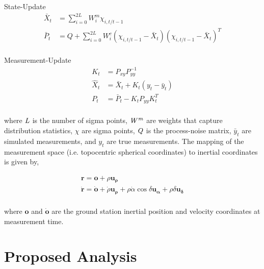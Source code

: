 \documentclass[a4paper]{article}
\renewcommand\vec{\mathbf}	%
\begin{document}
State-Update
\begin{equation}
\begin{aligned}
\bar{X}_t &= \sum_{i=0}^{2L} W^{m}_i \chi_{i,t/t-1} \\
\bar{P}_t &= Q + \sum_{i=0}^{2L} W^{c}_i (\chi_{i,t/t-1} - \bar{X}_t)(\chi_{i,t/t-1} - \bar{X}_t)^T  \\
\end{aligned}
\end{equation}

Measurement-Update
\begin{equation}
\begin{aligned}
K_t &= P_{xy}P^{-1}_{yy} \\
\hat{X}_t &= \bar{X}_t + K_t(y_t - \bar{y}_t) \\
P_t &= \bar{P}_t - K_tP_{yy}K^{T}_t \\
\end{aligned}
\end{equation}

where $\it L$ is the number of sigma points, $\it W^m$ are weights that capture distribution statistics, $\chi$ are sigma points, $\it Q$ is the process-noise matrix, $\bar{y}_t$ are simulated  measurements, and ${y}_t$ are true measurements. The mapping of the measurement space (i.e. topocentric spherical coordinates) to inertial coordinates is given by,

\begin{equation}
\begin{aligned}
\vec{r} = \vec{o} + \rho \vec{u_{\rho}} \\
\vec{\dot{r}} = \vec{\dot{o}} + \dot{\rho} \vec{u_{\rho}} + \rho \dot{\alpha} \cos\delta \vec{u_{\alpha}} + \rho \delta \vec{u_{\delta}} \\
\end{aligned}
\end{equation}

where $\vec{o}$ and $\vec{\dot{o}}$ are the ground station inertial position and velocity coordinates at measurement time.

\section{Proposed Analysis}
\end{document}
